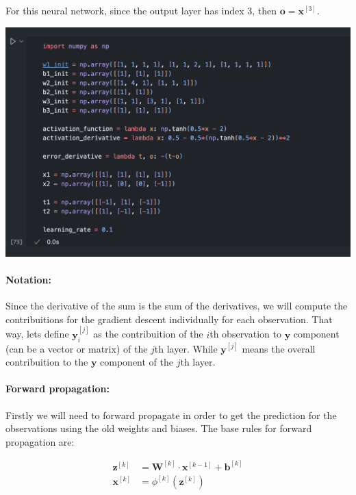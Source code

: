 \documentclass[12pt]{article}
\begin{document}
\begin{enumerate}[leftmargin=\labelsep]
    For this neural network, since the output layer has index 3, then $\mathbf{o} = \mathbf{x}^{[3]}$.

    \begin{center}
        \includegraphics[scale=0.5]{images/code2.png}
    \end{center}

    \paragraph{Notation:} Since the derivative of the sum is the sum of the derivatives, we will compute the contribuitions for the gradient descent individually for each observation. That way, lets define $\mathbf{y}_i^{[j]}$ as the contribuition of the $i$th observation to $\mathbf{y}$ component (can be a vector or matrix) of the $j$th layer. While $\mathbf{y}^{[j]}$ means the overall contribuition to the $\mathbf{y}$ component of the $j$th layer.

    \paragraph{Forward propagation:} Firstly we will need to forward propagate in order to get the prediction for the observations using the old weights and biases.
    The base rules for forward propagation are:

    \begin{equation}
    \begin{split}
        \mathbf{z}^{[k]} &= \mathbf{W}^{[k]} \cdot \mathbf{x}^{[k-1]} + \mathbf{b}^{[k]} \\
        \mathbf{x}^{[k]} &= \phi^{[k]}(\mathbf{z}^{[k]})
    \end{split}
    \end{equation}


\end{enumerate}
\end{document}
